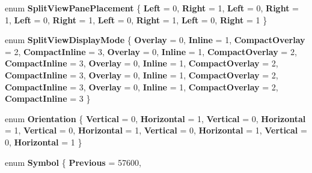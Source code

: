 \begin{DoxyCompactItemize}
enum {\bfseries Split\+View\+Pane\+Placement} \{ \newline
{\bfseries Left} = 0, 
{\bfseries Right} = 1, 
{\bfseries Left} = 0, 
{\bfseries Right} = 1, 
\newline
{\bfseries Left} = 0, 
{\bfseries Right} = 1, 
{\bfseries Left} = 0, 
{\bfseries Right} = 1, 
\newline
{\bfseries Left} = 0, 
{\bfseries Right} = 1
 \}
\item 
\mbox{\label{namespace_windows_1_1_u_i_1_1_xaml_1_1_controls_a027ad5600573e78453a72cce427da307}} 
enum {\bfseries Split\+View\+Display\+Mode} \{ \newline
{\bfseries Overlay} = 0, 
{\bfseries Inline} = 1, 
{\bfseries Compact\+Overlay} = 2, 
{\bfseries Compact\+Inline} = 3, 
\newline
{\bfseries Overlay} = 0, 
{\bfseries Inline} = 1, 
{\bfseries Compact\+Overlay} = 2, 
{\bfseries Compact\+Inline} = 3, 
\newline
{\bfseries Overlay} = 0, 
{\bfseries Inline} = 1, 
{\bfseries Compact\+Overlay} = 2, 
{\bfseries Compact\+Inline} = 3, 
\newline
{\bfseries Overlay} = 0, 
{\bfseries Inline} = 1, 
{\bfseries Compact\+Overlay} = 2, 
{\bfseries Compact\+Inline} = 3, 
\newline
{\bfseries Overlay} = 0, 
{\bfseries Inline} = 1, 
{\bfseries Compact\+Overlay} = 2, 
{\bfseries Compact\+Inline} = 3
 \}
\item 
\mbox{\label{namespace_windows_1_1_u_i_1_1_xaml_1_1_controls_a55286136757833c08ae3e37673161c2c}} 
enum {\bfseries Orientation} \{ \newline
{\bfseries Vertical} = 0, 
{\bfseries Horizontal} = 1, 
{\bfseries Vertical} = 0, 
{\bfseries Horizontal} = 1, 
\newline
{\bfseries Vertical} = 0, 
{\bfseries Horizontal} = 1, 
{\bfseries Vertical} = 0, 
{\bfseries Horizontal} = 1, 
\newline
{\bfseries Vertical} = 0, 
{\bfseries Horizontal} = 1
 \}
\item 
\mbox{\label{namespace_windows_1_1_u_i_1_1_xaml_1_1_controls_ab2786e53a8f4a8379dca4f44df7d4497}} 
enum {\bfseries Symbol} \{ \newline
{\bfseries Previous} = 57600, 

\end{DoxyCompactItemize}
